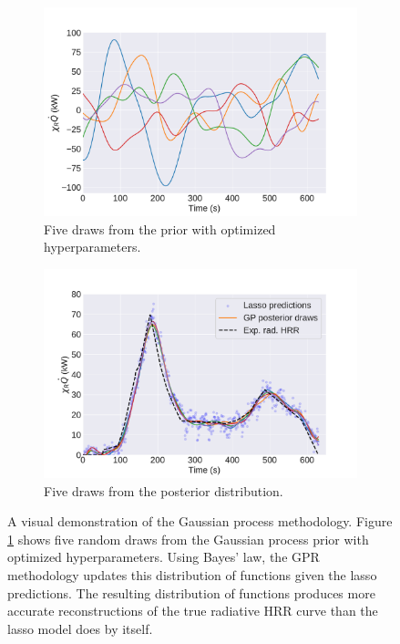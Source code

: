 \documentclass{article}
\begin{document}
\begin{figure}[htbp]
  \centering
  \begin{subfigure}[t]{.45\textwidth}
      \centering
      \includegraphics[width=\textwidth,keepaspectratio]{figures/gp_prior.pdf}
      \caption{Five draws from the prior with optimized hyperparameters.}
      \label{fig:gp_prior}
  \end{subfigure}
  \begin{subfigure}[t]{.45\textwidth}
      \centering
      \includegraphics[width=\textwidth ,keepaspectratio]{figures/gp_posterior.pdf}
      \caption{Five draws from the posterior distribution.}
      \label{fig:gp_posterior}
  \end{subfigure}
  \caption{A visual demonstration of the Gaussian process methodology. Figure \protect\ref{fig:gp_prior} shows five random draws from the Gaussian process prior with optimized hyperparameters. Using Bayes' law, the GPR methodology updates this distribution of functions given the lasso predictions. The resulting distribution of functions produces more accurate reconstructions of the true radiative HRR curve than the lasso model does by itself.} 
  \label{fig:gp_regression_example}
\end{figure}
\end{document}
